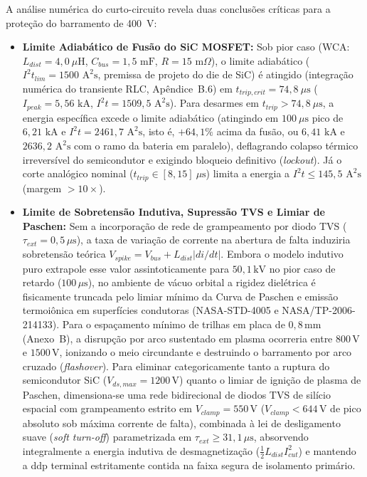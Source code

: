 A análise numérica do curto-circuito revela duas conclusões críticas para a proteção do barramento de 400~V:
\begin{itemize}[leftmargin=*]
    \item \textbf{Limite Adiabático de Fusão do SiC MOSFET:} Sob pior caso (WCA: $L_{dist} = 4{,}0\ \mu\text{H}$, $C_{bus} = 1{,}5\text{ mF}$, $R = 15\text{ m}\Omega$), o limite adiabático ($I^2t_{lim} = 1500\text{ A}^2\text{s}$, premissa de projeto do die de SiC) é atingido (integração numérica do transiente RLC, Apêndice~B.6) em $t_{trip,crit} = 74{,}8\ \mu\text{s}$ ($I_{peak} = 5{,}56\text{ kA}$, $I^2t = 1509{,}5\text{ A}^2\text{s}$). Para desarmes em $t_{trip} > 74{,}8\ \mu\text{s}$, a energia específica excede o limite adiabático (atingindo em $100\ \mu\text{s}$ pico de $6{,}21\text{ kA}$ e $I^2t = 2461{,}7\text{ A}^2\text{s}$, isto é, $+64{,}1\%$ acima da fusão, ou $6{,}41\text{ kA}$ e $2636{,}2\text{ A}^2\text{s}$ com o ramo da bateria em paralelo), deflagrando colapso térmico irreversível do semicondutor e exigindo bloqueio definitivo (\textit{lockout}). Já o corte analógico nominal ($t_{trip} \in [8, 15]\ \mu\text{s}$) limita a energia a $I^2t \le 145{,}5\text{ A}^2\text{s}$ (margem $> 10\times$).
    \item \textbf{Limite de Sobretensão Indutiva, Supressão TVS e Limiar de Paschen:} Sem a incorporação de rede de grampeamento por diodo TVS ($\tau_{ext} = 0{,}5\,\mu\text{s}$), a taxa de variação de corrente na abertura de falta induziria sobretensão teórica $V_{spike} = V_{bus} + L_{dist}|di/dt|$. Embora o modelo indutivo puro extrapole esse valor assintoticamente para $50{,}1\,\mathrm{kV}$ no pior caso de retardo ($100\,\mu\text{s}$), no ambiente de vácuo orbital a rigidez dielétrica é fisicamente truncada pelo limiar mínimo da Curva de Paschen e emissão termoiônica em superfícies condutoras (NASA-STD-4005 e NASA/TP-2006-214133). Para o espaçamento mínimo de trilhas em placa de $0{,}8\,\mathrm{mm}$ (Anexo~B), a disrupção por arco sustentado em plasma ocorreria entre $800\,\mathrm{V}$ e $1500\,\mathrm{V}$, ionizando o meio circundante e destruindo o barramento por arco cruzado (\textit{flashover}).     Para eliminar categoricamente tanto a ruptura do semicondutor SiC ($V_{ds,max} = 1200\,\mathrm{V}$) quanto o limiar de ignição de plasma de Paschen, dimensiona-se uma rede bidirecional de diodos TVS de silício espacial com grampeamento estrito em $V_{clamp} = 550\,\mathrm{V}$ ($V_{clamp} < 644\,\mathrm{V}$ de pico absoluto sob máxima corrente de falta), combinada à lei de desligamento suave (\textit{soft turn-off}) parametrizada em $\tau_{ext} \ge 31{,}1\,\mu\text{s}$, absorvendo integralmente a energia indutiva de desmagnetização ($\frac{1}{2} L_{dist} I_{cut}^2$) e mantendo a ddp terminal estritamente contida na faixa segura de isolamento primário.

\end{itemize}
